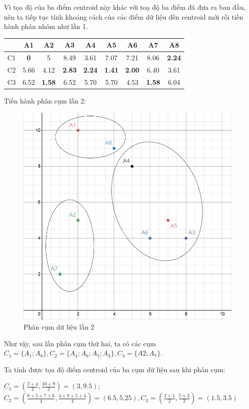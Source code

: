 \documentclass{article}
\begin{document}
	Vì tọa độ của ba điểm centroid này khác với toạ độ ba điểm đã đưa ra ban đầu, nên ta tiếp tục tính khoảng cách của các điểm dữ liệu đến centroid mới rồi tiến hành phân nhóm như lần 1.\par
	\begin{table}[h]
		\centering
		\begin{tabular}{|c|c|c|c|c|c|c|c|c|}
			\hline
			& A1 & A2 & A3 & A4 & A5 & A6 & A7 & A8 \\
			\hline
			C1 & \textbf{0} & 5 & 8.49 & 3.61 & 7.07 & 7.21 & 8.06 & \textbf{2.24} \\
			\hline
			C2 & 5.66 & 4.12 & \textbf{2.83} & \textbf{2.24} & \textbf{1.41} & \textbf{2.00} & 6.40 & 3.61 \\
			\hline
			C3 & 6.52 & \textbf{1.58} & 6.52 & 5.70 & 5.70 & 4.53 & \textbf{1.58} & 6.04 \\
			\hline
		\end{tabular}
	\end{table}
	\newpage
	Tiến hành phân cụm lần 2:
	\begin{figure}[h]
		\centering
		\includegraphics[width=0.6\linewidth]{img/ex_4}
		\caption{Phân cụm dữ liệu lần 2}
	\end{figure}\par
	Như vậy, sau lần phân cụm thứ hai, ta có các cụm $C_1 = \{A_1; A_8\}, C_2 = \{A_4; A_6; A_5; A_3\}, C_3 = \{A2; A_7\}$.\par
	\newpage
	Ta tính được tọa độ điểm centroid của ba cụm dữ liệu sau khi phân cụm:\par
	\medskip
	$C_1 = \left(\frac{2+4}{2}, \frac{10+9}{2}\right) = (3, 9.5)$; $C_2 = \left(\frac{8+5+7+6}{4}, \frac{4+8+5+4}{4}\right) = (6.5,5.25), C_3 = \left(\frac{2+1}{2}, \frac{5+2}{2}\right) = (1.5, 3.5)$\par
\end{document}

